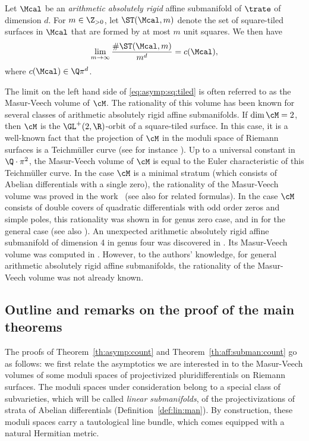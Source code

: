 \begin{Theorem}\label{th:aff:subman:count}
Let $\Mcal$ be an \emph{arithmetic absolutely rigid} affine submanifold of $\trate$ of dimension $d$. For $m\in \Z_{>0}$, let $\ST(\Mcal,m)$ denote the set of square-tiled surfaces in $\Mcal$ that are formed by at most $m$ unit squares. We then have
\begin{equation}\label{eq:asymp:sq:tiled}
\lim_{m \to \infty}\frac{\#\ST(\Mcal,m)}{m^{d}}=c(\Mcal),
\end{equation}
where $c(\Mcal) \in \Q\pi^{d}$.
\end{Theorem}
The limit on the left hand side of \eqref{eq:asymp:sq:tiled} is often referred to as the Masur-Veech volume of $\cM$.
The rationality of this volume has been known for several classes of arithmetic absolutely rigid affine submanifolds.
If $\dim \cM=2$, then $\cM$ is the $\GL^+(2,\R)$\nobreakdash-orbit of a square-tiled surface. In this case, it is a well-known fact that the projection of $\cM$ in the moduli space of Riemann surfaces is a Teichmüller curve (see for instance \cite{SW04}). Up to a universal constant in $\Q\cdot\pi^2$, the Masur-Veech volume of $\cM$ is equal to the Euler characteristic of this Teichmüller curve.
In the case $\cM$ is a minimal stratum (which consists of Abelian differentials with a single zero), the rationality of the Masur-Veech volume was proved in the work~\cite{EO01} (see also \cite{Sau18} for related formulas). In the case $\cM$ consists of double covers of quadratic differentials with odd order zeros and simple poles, this rationality was shown in \cite{AEZ16} for genus zero case, and in \cite{CMS19} for the general case (see also \cite{EO06,Goujard}).
An unexpected arithmetic absolutely rigid affine submanifold of dimension 4 in genus four was discovered in \cite{MMW17}.
Its Masur-Veech volume was computed in \cite{TT19}.
However, to the authors' knowledge, for general arithmetic absolutely rigid affine submanifolds, the rationality of the Masur-Veech volume was not already known.

\subsection{Outline and remarks on the proof of the main theorems}\label{subsec:outline}
The proofs of Theorem~\ref{th:asymp:count} and Theorem~\ref{th:aff:subman:count} go as follows: we first relate the asymptotics we are interested in to the Masur-Veech volumes of some moduli spaces of projectivized pluri\-differentials on Riemann surfaces. The moduli spaces under consideration belong to a special class of subvarieties, which will be called \emph{linear submanifolds}, of the projectivizations of strata of Abelian differentials (\cf Definition~\ref{def:lin:man}). By construction, these moduli spaces carry a tautological line bundle, which comes equipped with a natural Hermitian metric.

